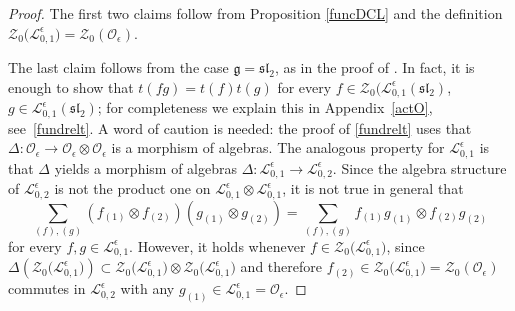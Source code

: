 \documentclass[10pt,a4paper]{amsart}
\numberwithin{equation}{section}
\theoremstyle{definition}
\newcommand{\e}{\epsilon}
\newcommand{\Ll}{{\mathcal L}}
\newcommand{\Oo}{{\mathcal O}}
\newcommand{\ra}{\rightarrow}
\begin{document}
\begin{proof} The first two claims follow from Proposition \ref{funcDCL} and the definition ${\mathcal{Z}_0\bigl(\Ll_{0,1}^\e\bigr) = \mathcal{Z}_0(\Oo_\e)}$.

The last claim follows from the case $\mathfrak{g}={\mathfrak{sl}_2}$, as in the proof of \cite[Proposition~7.1]{DC-L}. In fact, it is enough to show that $t(fg) = t(f)t(g)$ for every $f\in \mathcal{Z}_0(\Ll_{0,1}^\e({\mathfrak{sl}_2})$, $g\in \Ll_{0,1}^\e({\mathfrak{sl}_2})$; for completeness we explain this in Appendix~\ref{actO}, see~\eqref{fundrelt}. A word of caution is needed: the proof of \eqref{fundrelt} uses that $\Delta\colon \Oo_\e \ra \Oo_\e \otimes \Oo_\e$ is a morphism of algebras. The analogous property for $\Ll_{0,1}^\e$ is that $\Delta$ yields a morphism of algebras $\Delta\colon \Ll_{0,1}^\e \ra \Ll_{0,2}^\e$. Since the algebra structure of $\Ll_{0,2}^\e$ is not the product one on $\Ll_{0,1}^\e\otimes \Ll_{0,1}^\e$, it is not true in general that
\[ \sum_{(f),(g)} (f_{(1)}\otimes f_{(2)})(g_{(1)} \otimes g_{(2)}) = \sum_{(f),(g)} f_{(1)}g_{(1)}\otimes f_{(2)}g_{(2)}
\]
 for every $f,g\in \Ll_{0,1}^\e$. However, it holds whenever $f\in \mathcal{Z}_0\bigl(\Ll_{0,1}^\e\bigr)$, since $\Delta(\mathcal{Z}_0\bigl(\Ll_{0,1}^\e\bigr)) \subset \mathcal{Z}_0\bigl(\Ll_{0,1}^\e\bigr) \otimes \mathcal{Z}_0\bigl(\Ll_{0,1}^\e\bigr)$ and therefore $f_{(2)}\in \mathcal{Z}_0\bigl(\Ll_{0,1}^\e\bigr) = \mathcal{Z}_0(\Oo_\e)$ commutes in $\Ll_{0,2}^\e$ with any ${g_{(1)}\in \Ll_{0,1}^\e = \Oo_\e}$.


\end{proof}
\end{document}
